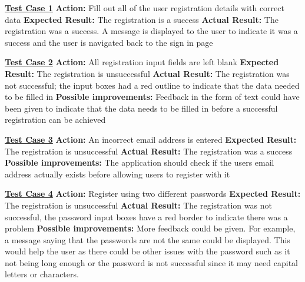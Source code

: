 \documentclass[english]{article}
\begin{document}
\textbf{\underline{Test Case 1}}\newline
\textbf{Action:} Fill out all of the user registration details with correct data\newline
\textbf{Expected Result:} The registration is a success\newline
\textbf{Actual Result:} The registration was a success. A message is displayed to the user to indicate it was a success and the user is navigated back to the sign in page\newline

\textbf{\underline{Test Case 2}}\newline
\textbf{Action:} All registration input fields are left blank\newline
\textbf{Expected Result:} The registration is unsuccessful\newline
\textbf{Actual Result:} The registration was not successful; the input boxes had a red outline to indicate that the data needed to be filled in\newline
\textbf{Possible improvements:} Feedback in the form of text could have been given to indicate that the data needs to be filled in before a successful registration can be achieved\newline

\textbf{\underline{Test Case 3}}\newline
\textbf{Action:} An incorrect email address is entered\newline
\textbf{Expected Result:} The registration is unsuccessful\newline
\textbf{Actual Result:} The registration was a success\newline
\textbf{Possible improvements:} The application should check if the users email address actually exists before allowing users to register with it\newline

\textbf{\underline{Test Case 4}}\newline
\textbf{Action:} Register using two different passwords\newline
\textbf{Expected Result:} The registration is unsuccessful\newline
\textbf{Actual Result:} The registration was not successful, the password input boxes have a red border to indicate there was a problem \newline
\textbf{Possible improvements:} More feedback could be given. For example, a message saying that the passwords are not the same could be displayed. This would help the user as there could be other issues with the password such as it not being long enough or the password is not successful since it may need capital letters or characters.\newline
\end{document}
